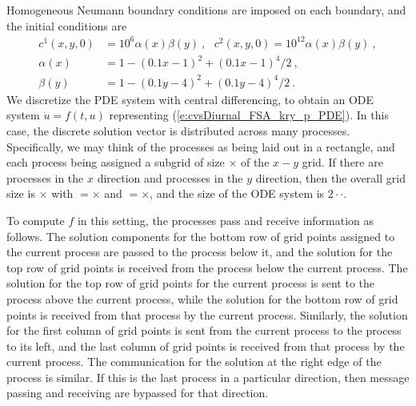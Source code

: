 Homogeneous Neumann boundary conditions are imposed on each boundary, and the
initial conditions are 
\begin{equation} \label{e:cvsDiurnal_FSA_kry_p_IC}
  \begin{split}
  c^{1}(x,y,0) &= 10^{6}\alpha (x)\beta (y) ~,~~~ 
                    c^{2}(x,y,0)=10^{12}\alpha(x)\beta (y) ~, \\
  \alpha (x) &= 1-(0.1x-1)^{2}+(0.1x-1)^{4}/2 ~, \\
  \beta (y) &= 1-(0.1y-4)^{2}+(0.1y-4)^{4}/2 ~.
  \end{split} 
\end{equation}
We discretize the PDE system with central differencing, to
obtain an ODE system ${\dot u} = f(t,u)$ representing (\ref{e:cvsDiurnal_FSA_kry_p_PDE}).  
In this case, the discrete solution vector is distributed across
many processes.  Specifically, we may think of the processes as
being laid out in a rectangle, and each process being assigned a
subgrid of size $\times$ of the $x-y$ grid. If
there are  processes in the $x$ direction and 
processes in the $y$ direction, then the overall grid size is
$\times$ with $=$$\times$ and
$=$$\times$, and the size of the ODE system is
$2\cdot$$\cdot$.  

To compute $f$ in this setting, the processes pass and receive
information as follows.  The solution components for the bottom row of
grid points assigned to the current process are passed to the process below
it, and the solution for the top row of grid points is received from
the process below the current process. The solution for the top
row of grid points for the current process is sent to the process
above the current process, while the solution for the bottom row of
grid points is received from that process by the current
process. Similarly, the solution for the first column of grid points
is sent from the current process to the process to its left, and
the last column of grid points is received from that process by the
current process. The communication for the solution at the right
edge of the process is similar. If this is the last process in a
particular direction, then message passing and receiving are bypassed
for that direction.

